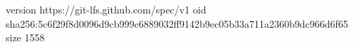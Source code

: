 version https://git-lfs.github.com/spec/v1
oid sha256:5c6f29f8d0096d9cb999c6889032ff9142b9ec05b33a711a2360b9dc966d6f65
size 1558
